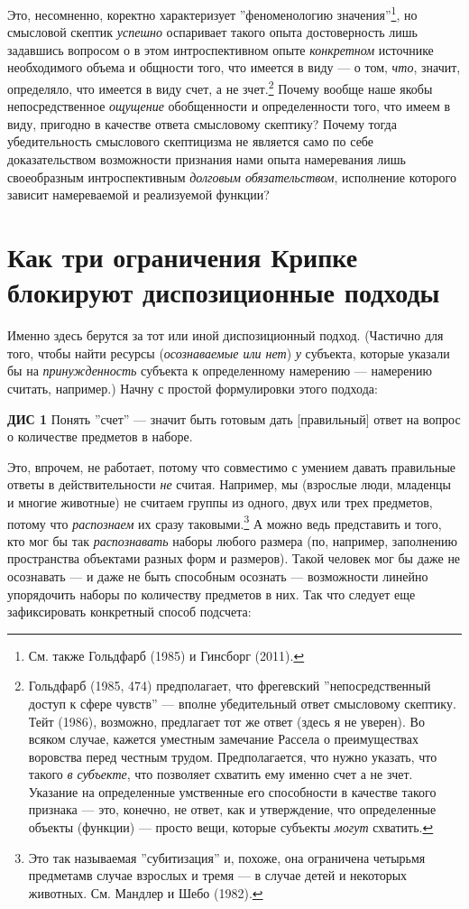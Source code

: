 \documentclass[11pt]{book}
\begin{document}
Это, несомненно, коректно характеризует ''феноменологию значения''\footnote{См. также Гольдфарб (1985) и Гинсборг (2011).}, но смысловой скептик \textit{успешно} оспаривает такого опыта достоверность лишь задавшись вопросом о в этом интроспективном опыте \textit{конкретном} источнике необходимого объема и общности того, что имеется в виду --- о том, \textit{что}, значит, определяло, что имеется в виду счет, а не зчет.\footnote{Гольдфарб (1985, 474) предполагает, что фрегевский ''непосредственный доступ к сфере чувств'' --- вполне убедительный ответ смысловому скептику. Тейт (1986), возможно, предлагает тот же ответ (здесь я не уверен). Во всяком случае, кажется уместным замечание Рассела о преимуществах воровства перед честным трудом. Предполагается, что нужно указать, что такого \textit{в субъекте}, что позволяет схватить ему именно счет а не зчет. Указание на определенные умственные его способности в качестве такого признака --- это, конечно, не ответ, как и утверждение, что определенные объекты (функции) --- просто вещи, которые субъекты \textit{могут} схватить.} Почему вообще наше якобы непосредственное \textit{ощущение} обобщенности и определенности того, что имеем в виду, пригодно в качестве ответа смысловому скептику? Почему тогда убедительность смыслового скептицизма не является само по себе доказательством возможности признания нами опыта намеревания лишь своеобразным интроспективным \textit{долговым обязательством}, исполнение которого зависит намереваемой и реализуемой функции?

\section{Как три ограничения Крипке блокируют диспозиционные подходы}

Именно здесь берутся за тот или иной диспозиционный подход. (Частично для того, чтобы найти ресурсы (\textit{осознаваемые или нет}) \textit{у} субъекта, которые указали бы на \textit{принужденность} субъекта к определенному намерению --- намерению считать, например.) Начну с простой формулировки этого подхода:

\smallskip

  \textbf{ДИС 1} \quad Понять ''счет'' --- значит быть готовым дать [правильный] ответ на вопрос о количестве предметов в наборе.

\smallskip

Это, впрочем, не работает, потому что совместимо с умением давать правильные ответы в действительности \textit{не} считая. Например, мы (взрослые люди, младенцы и многие животные) не считаем группы из одного, двух или трех предметов, потому что \textit{распознаем} их сразу таковыми.\footnote{Это так называемая ''субитизация'' и, похоже, она ограничена четырьмя предметамв случае взрослых и тремя --- в случае детей и некоторых животных. См. Мандлер и Шебо (1982).} А можно ведь представить и того, кто мог бы так \textit{распознавать} наборы любого размера (по, например, заполнению пространства объектами разных форм и размеров). Такой человек мог бы даже не осознавать --- и даже не быть способным осознать --- возможности линейно упорядочить наборы по количеству предметов в них. Так что следует еще зафиксировать конкретный способ подсчета:
\end{document}
